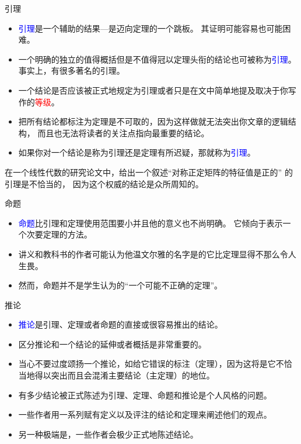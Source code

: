 \documentclass[13pt]{ctexbeamer}
\newcommand{\red}[1]{\textcolor{red}{#1}}
\newcommand{\blue}[1]{\textcolor{blue}{#1}}
\begin{document}
\begin{frame}{引理}
	
\begin{itemize}
	\item 
	\blue{引理}是一个辅助的结果—是迈向定理的一个跳板。
	其证明可能容易也可能困难。
	
\item 一个明确的独立的值得概括但是不值得冠以定理头衔的结论也可被称为\blue{引理}。
事实上，有很多著名的引理。
\item 
	一个结论是否应该被正式地规定为引理或者只是在文中简单地提及取决于你写作的\red{等级}。
\item 
\alert{把所有结论都标注为定理是不可取的}，因为这样做就无法突出你文章的逻辑结构，
而且也无法将读者的关注点指向最重要的结论。
\item 如果你对一个结论是称为引理还是定理有所迟疑，那就称为\blue{引理}。
\end{itemize}


在一个线性代数的研究论文中，给出一个叙述``对称正定矩阵的特征值是正的'' 的引理是不恰当的， 
因为这个权威的结论是众所周知的。

\end{frame}


\begin{frame}{命题}
\begin{itemize}
	\item 
\blue{命题}比引理和定理使用范围要小并且他的意义也不尚明确。
它倾向于表示一个次要定理的方法。
\item 讲义和教科书的作者可能认为他温文尔雅的名字是的它比定理显得不那么令人生畏。
 \item 然而，命题并不是学生认为的“一个可能不正确的定理”。
\end{itemize}
\end{frame}

\begin{frame}{推论}
\begin{itemize}
\item \blue{推论}是引理、定理或者命题的直接或很容易推出的结论。
\item 区分推论和一个结论的延伸或者概括是非常重要的。
\item 当心不要过度颂扬一个推论，如给它错误的标注（定理），因为这将是它不恰当地得以突出而且会混淆主要结论（主定理）的地位。
\end{itemize}
\end{frame}

\begin{frame}
\begin{itemize}
\item 有多少结论被正式陈述为引理、定理、命题和推论是个人风格的问题。
\item 一些作者用一系列赋有定义以及评注的结论和定理来阐述他们的观点。
\item 另一种极端是，一些作者会极少正式地陈述结论。
\end{itemize}
\end{frame}
\end{document}
